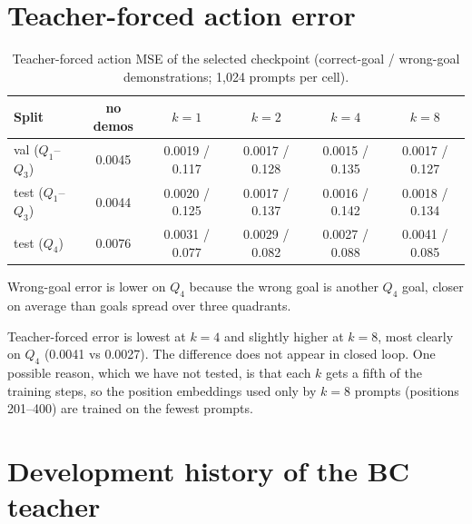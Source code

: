 \section{Teacher-forced action error}
\label{app:action-error}
\begin{table}[h]
\centering
\caption{Teacher-forced action MSE of the selected checkpoint (correct-goal / wrong-goal demonstrations; 1{,}024 prompts per cell).}
\label{tab:action-error}
\small
\begin{tabular}{lccccc}
\toprule
Split & no demos & $k{=}1$ & $k{=}2$ & $k{=}4$ & $k{=}8$ \\
\midrule
val ($Q_1$--$Q_3$) & 0.0045 & 0.0019 / 0.117 & 0.0017 / 0.128 & 0.0015 / 0.135 & 0.0017 / 0.127 \\
test ($Q_1$--$Q_3$) & 0.0044 & 0.0020 / 0.125 & 0.0017 / 0.137 & 0.0016 / 0.142 & 0.0018 / 0.134 \\
test ($Q_4$) & 0.0076 & 0.0031 / 0.077 & 0.0029 / 0.082 & 0.0027 / 0.088 & 0.0041 / 0.085 \\
\bottomrule
\end{tabular}
\end{table}
Wrong-goal error is lower on $Q_4$ because the wrong goal is another $Q_4$ goal, closer on average than goals spread over three quadrants.

Teacher-forced error is lowest at $k = 4$ and slightly higher at $k = 8$, most clearly on $Q_4$ (0.0041 vs 0.0027). The difference
does not appear in closed loop. One possible reason, which we have not tested, is that each $k$ gets a fifth of the training steps,
so the position embeddings used only by $k = 8$ prompts (positions 201--400) are trained on the fewest prompts.

\section{Development history of the BC teacher}
\label{app:teacher-history}

